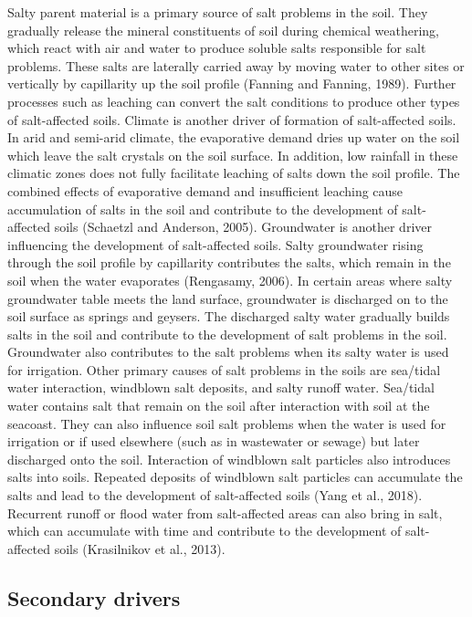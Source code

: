 \documentclass[
  10pt,
  b5paper,
]{book}
\begin{document}
Salty parent material is a primary source of salt problems in the soil. They gradually release the mineral constituents of soil during chemical weathering, which react with air and water to produce soluble salts responsible for salt problems. These salts are laterally carried away by moving water to other sites or
vertically by capillarity up the soil profile (Fanning and Fanning, 1989). Further processes such as leaching can convert the salt conditions to produce other types of salt-affected soils.
Climate is another driver of formation of salt-affected soils. In arid and semi-arid climate, the evaporative demand dries up water on the soil which leave the salt crystals on the soil surface. In addition, low rainfall in these climatic zones does not fully facilitate leaching of salts down the soil profile. The combined effects of evaporative demand and insufficient leaching cause accumulation of salts in the soil and contribute to the development of salt-affected soils (Schaetzl and Anderson, 2005).
Groundwater is another driver influencing the development of salt-affected soils. Salty groundwater rising through the soil profile by capillarity contributes the salts, which remain in the soil when the water evaporates (Rengasamy, 2006). In certain areas where salty groundwater table meets the land surface, groundwater is discharged on to the soil surface as springs and geysers. The discharged salty water gradually builds salts in the soil and contribute to the development of salt problems in the soil. Groundwater also contributes to the salt problems when its salty water is used for irrigation.
Other primary causes of salt problems in the soils are sea/tidal water interaction, windblown salt deposits, and salty runoff water. Sea/tidal water contains salt that remain on the soil after interaction with soil at the seacoast. They can also influence soil salt problems when the water is used for irrigation or if used elsewhere (such as in wastewater or sewage) but later discharged onto the soil. Interaction of windblown salt particles also introduces salts into soils. Repeated deposits of windblown salt particles can accumulate the salts and lead to the development of salt-affected soils (Yang et al., 2018). Recurrent runoff or flood water from salt-affected areas can also bring in salt, which can accumulate with time and contribute to the development of salt-affected soils (Krasilnikov et al., 2013).

\hypertarget{secondary-drivers}{%
\subsection{Secondary drivers}\label{secondary-drivers}}
\end{document}
